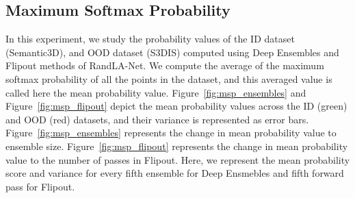     \subsection{Maximum Softmax Probability}
    \label{sec:prob_sem3dvs3dis}
    In this experiment, we study the probability values of the ID dataset (Semantic3D), and OOD dataset (S3DIS) computed using Deep Ensembles and Flipout methods of RandLA-Net.
    We compute the average of the maximum softmax probability of all the points in the dataset, and this averaged value is called here the mean probability value.
    Figure~\ref{fig:msp_ensembles} and Figure~\ref{fig:msp_flipout} depict the mean probability values across the ID (green) and OOD (red) datasets, and their variance is represented as error bars.
    Figure~\ref{fig:msp_ensembles} represents the change in mean probability value to ensemble size.
    Figure~\ref{fig:msp_flipout} represents the change in mean probability value to the number of passes in Flipout.
    Here, we represent the mean probability score and variance for every fifth ensemble for Deep Ensmebles and fifth forward pass for Flipout.
